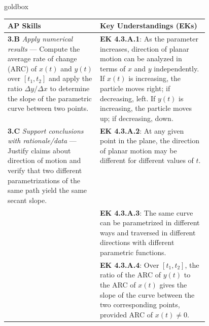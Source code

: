 \documentclass[10pt]{article}
\begin{document}
\begin{skillbox}{goldbox}
\begin{tabularx}{\linewidth}{@{} p{0.46\linewidth} X @{}}
\textbf{AP Skills} & \textbf{Key Understandings (EKs)} \\
\midrule
\textbf{3.B} \textit{Apply numerical results} ---
  Compute the average rate of change (ARC) of $x(t)$ and $y(t)$ over
  $[t_1, t_2]$ and apply the ratio $\Delta y / \Delta x$ to determine
  the slope of the parametric curve between two points.
&
\textbf{EK 4.3.A.1}: As the parameter increases, direction of planar
motion can be analyzed in terms of $x$ and $y$ independently.
If $x(t)$ is increasing, the particle moves right; if decreasing, left.
If $y(t)$ is increasing, the particle moves up; if decreasing, down. \\[4pt]

\textbf{3.C} \textit{Support conclusions with rationale/data} ---
  Justify claims about direction of motion and verify that two different
  parametrizations of the same path yield the same secant slope.
&
\textbf{EK 4.3.A.2}: At any given point in the plane, the direction of
planar motion may be different for different values of $t$. \\[4pt]

&
\textbf{EK 4.3.A.3}: The same curve can be parametrized in different ways
and traversed in different directions with different parametric functions. \\[4pt]

&
\textbf{EK 4.3.A.4}: Over $[t_1, t_2]$, the ratio of the ARC of $y(t)$
to the ARC of $x(t)$ gives the slope of the curve between the two
corresponding points, provided ARC of $x(t) \ne 0$. \\
\end{tabularx}
\end{skillbox}

\vspace{0.08in}
\end{document}
